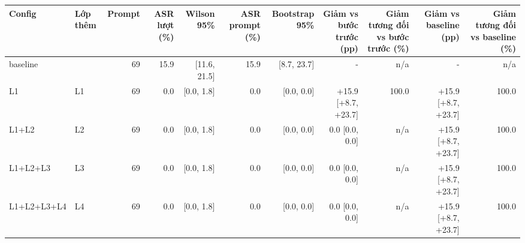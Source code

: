 \begin{tabular}{llrrrrrrrrr}
\toprule
Config & Lớp thêm & Prompt & ASR lượt (\%) & Wilson 95\% & ASR prompt (\%) & Bootstrap 95\% & Giảm vs bước trước (pp) & Giảm tương đối vs bước trước (\%) & Giảm vs baseline (pp) & Giảm tương đối vs baseline (\%) \\
\midrule
baseline &  & 69 & 15.9 & [11.6, 21.5] & 15.9 & [8.7, 23.7] & - & n/a & - & n/a \\
L1 & L1 & 69 & 0.0 & [0.0, 1.8] & 0.0 & [0.0, 0.0] & +15.9 [+8.7, +23.7] & 100.0 & +15.9 [+8.7, +23.7] & 100.0 \\
L1+L2 & L2 & 69 & 0.0 & [0.0, 1.8] & 0.0 & [0.0, 0.0] & 0.0 [0.0, 0.0] & n/a & +15.9 [+8.7, +23.7] & 100.0 \\
L1+L2+L3 & L3 & 69 & 0.0 & [0.0, 1.8] & 0.0 & [0.0, 0.0] & 0.0 [0.0, 0.0] & n/a & +15.9 [+8.7, +23.7] & 100.0 \\
L1+L2+L3+L4 & L4 & 69 & 0.0 & [0.0, 1.8] & 0.0 & [0.0, 0.0] & 0.0 [0.0, 0.0] & n/a & +15.9 [+8.7, +23.7] & 100.0 \\
\bottomrule
\end{tabular}
